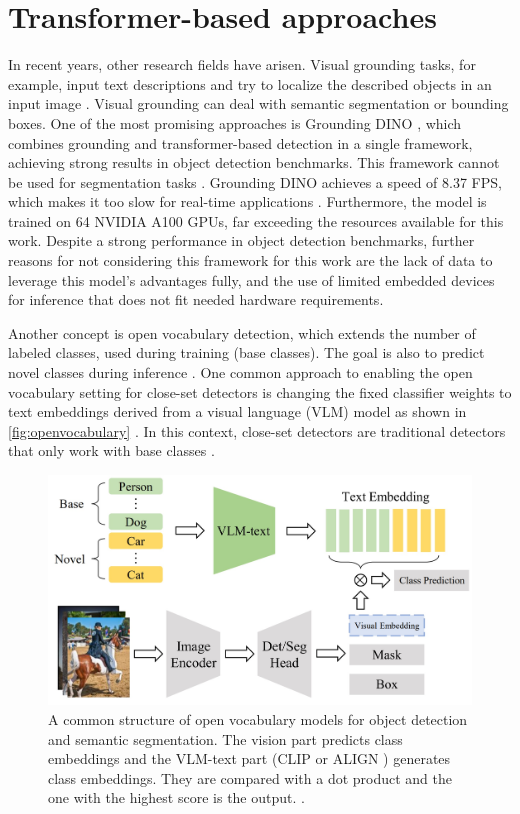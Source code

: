 \section{Transformer-based approaches}
\label{sec:transformerBasedApproaches}

In recent years, other research fields have arisen.
Visual grounding tasks, for example, input text descriptions and try to localize the described objects in an input image \cite{openvocabularysurvey2024}.
Visual grounding can deal with semantic segmentation or bounding boxes.
One of the most promising approaches is Grounding DINO \cite{groundingdino2024}, which combines grounding and transformer-based detection in a single framework, achieving strong results in object detection benchmarks.
This framework cannot be used for segmentation tasks \cite{glipv22022}.
Grounding DINO achieves a speed of 8.37 FPS, which makes it too slow for real-time applications \cite{groundingdino2024}.
Furthermore, the model is trained on 64 NVIDIA A100 GPUs, far exceeding the resources available for this work.
Despite a strong performance in object detection benchmarks, further reasons for not considering this framework for this work are the lack of data to leverage this model's advantages fully, and the use of limited embedded devices for inference that does not fit needed hardware requirements.

\vspace{0.5cm}

Another concept is open vocabulary detection, which extends the number of labeled classes, used during training (base classes).
The goal is also to predict novel classes during inference \cite{openvocabularysurvey2024}.
One common approach to enabling the open vocabulary setting for close-set detectors is changing the fixed classifier weights to text embeddings derived from a visual language (VLM) model as shown in \autoref{fig:openvocabulary} \cite{openvocabularysurvey2024}.
In this context, close-set detectors are traditional detectors that only work with base classes \cite{anonymous2024openvocabulary}.

\begin{figure}[H]
    \centering
    \includegraphics[width=0.55\linewidth]{PICs/tansformerSOTA/openvocabulary.jpg}
    \caption{A common structure of open vocabulary models for object detection and semantic segmentation. The vision part predicts class embeddings and the VLM-text part (CLIP \cite{CLIP2021} or ALIGN \cite{ALIGN2021}) generates class embeddings. They are compared with a dot product and the one with the highest score is the output. \cite{openvocabularysurvey2024}.}
    \label{fig:openvocabulary}
\end{figure}

